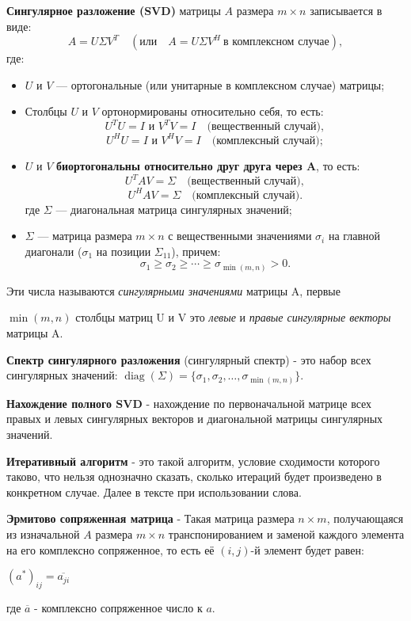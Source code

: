 \hspace{0.45cm} \textbf{Сингулярное разложение (SVD)} матрицы \( A \) размера \( m \times n \) записывается в виде:
\[
A = U \Sigma V^T \quad (\text{или} \quad A = U \Sigma V^H \ \text{в комплексном случае}),
\]
где:
\begin{itemize}
    \item \( U \) и \( V \) — ортогональные (или унитарные в комплексном случае) матрицы;
    \item Столбцы \( U \) и \( V \) ортонормированы относительно себя, то есть:
    \[
    U^T U = I \text{ и } V^T V = I \quad \text{(вещественный случай)},
    \]
    \[
    U^H U = I \text{ и } V^H V = I \quad \text{(комплексный случай)};
    \]
    \item \( U \) и \( V \) \textbf{биортогональны относительно друг друга через A}, то есть:
    \[
    U^T A V = \Sigma \quad \text{(вещественный случай)},
    \]
    \[
    U^H A V = \Sigma \quad \text{(комплексный случай)}.
    \]
    где \( \Sigma \) — диагональная матрица сингулярных значений;
    \item \( \Sigma \) — матрица размера \( m \times n \) с вещественными значениями \( \sigma_i \) на главной диагонали (\( \sigma_1 \) на позиции \( \Sigma_{11} \)), причем:
    \[
    \sigma_1 \geq \sigma_2 \geq \cdots \geq \sigma_{\min(m, n)} \gt 0.
    \]
\end{itemize}

Эти числа называются \textit{сингулярными значениями} матрицы A, первые 

\(\min(m,n)\) столбцы матриц U и V это \textit{левые} и \textit{правые сингулярные векторы} матрицы A.

\textbf{Спектр сингулярного разложения} (сингулярный спектр) - это набор всех сингулярных значений: \( \operatorname{diag}(\Sigma) = \{ \sigma_1, \sigma_2, \dots, \sigma_{\min(m, n)} \} \).

\textbf{Нахождение полного SVD} - нахождение по первоначальной матрице всех правых и левых сингулярных векторов и диагональной матрицы сингулярных значений. 

\textbf{Итеративный алгоритм} - это такой алгоритм, условие сходимости которого таково, что нельзя однозначно сказать, сколько итераций будет произведено в конкретном случае. Далее в тексте при использовании слова. 

\textbf{Эрмитово сопряженная матрица} - Такая матрица размера $n \times m$, получающаяся из изначальной $A$  размера $m \times n$ транспонированием и заменой каждого элемента на его комплексно сопряженное, то есть её $(i, j)$-й элемент будет равен:
\begin{center}
$(a^*)_{ij} = \overline{a_{ji}}$
\end{center}
где $\overline{a}$ - комплексно сопряженное число к $a$.


